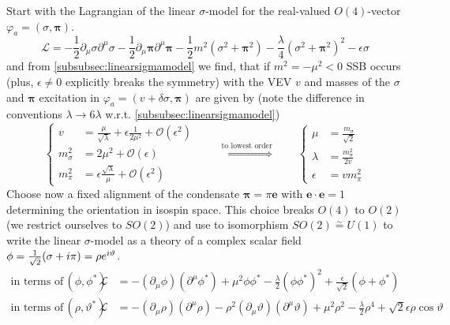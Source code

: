 Start with the Lagrangian of the linear $\sigma$-model for the real-valued $O(4)$-vector $\varphi_a=(\sigma,\mathbf{\pi})$.
\begin{equation}
    \mathscr{L}=-\frac{1}{2}\partial_\mu\sigma\partial^\mu\sigma-\frac{1}{2}\partial_\mu\mathbf{\pi}\partial^\mu\mathbf{\pi}-\frac{1}{2}m^2(\sigma^2+\mathbf{\pi}^2)-\frac{\lambda}{4}(\sigma^2+\mathbf{\pi}^2)^2-\epsilon\sigma
\end{equation}
and from \ref{subsubsec:linearsigmamodel} we find, that if $m^2=-\mu^2<0$ SSB occurs (plus, $\epsilon\neq 0$ explicitly breaks the symmetry) with the VEV $v$ and masses of the $\sigma$ and $\mathbf{\pi}$ excitation in $\varphi_a=(v+\delta\sigma,\mathbf{\pi})$ are given by (note the difference in conventions $\lambda\to 6\lambda$ w.r.t. \ref{subsubsec:linearsigmamodel})
\begin{equation}
    \left\{
    \begin{split}
        v          & =\frac{\mu}{\sqrt{\lambda}}+\epsilon\frac{1}{2\mu^2}+\mathcal{O}(\epsilon^2) \\
        m_\sigma^2 & =2\mu^2+\mathcal{O}(\epsilon)                                                \\
        m_\pi^2    & =\epsilon\frac{\sqrt{\lambda}}{\mu}+\mathcal{O}(\epsilon^2)
    \end{split}
    \right.\qquad\overset{\text{to lowest order}}{\iff}\qquad
    \left\{
    \begin{split}
        \mu&=\frac{m_\sigma}{\sqrt{2}}\\
        \lambda&=\frac{m_\sigma^2}{2v}\\
        \epsilon&=vm_\pi^2
    \end{split}
    \right.
    \label{eq:LinearSigmaModel_CouplingsMassesRelation}
\end{equation}
Choose now a fixed alignment of the condensate $\mathbf{\pi}=\pi\mathbf{e}$ with $\mathbf{e}\cdot\mathbf{e}=1$ determining the orientation in isospin space. This choice breaks $O(4)$ to $O(2)$ (we restrict ourselves to $SO(2)$) and use to isomorphism $SO(2)\overset{\sim}{=}U(1)$ to write the linear $\sigma$-model as a theory of a complex scalar field $\phi=\frac{1}{\sqrt{2}}(\sigma+{i}\pi)=\rho e^{{i}\vartheta}$.
\begin{subequations}
    \begin{align}
        \text{in terms of}\,(\phi,\phi^*)      &  & \mathscr{L} & =-(\partial_\mu\phi)(\partial^\mu\phi^*)+\mu^2\phi\phi^*-\frac{\lambda}{2}(\phi\phi^*)^2+\frac{\epsilon}{\sqrt{2}}(\phi+\phi^*)                                   \\
        \text{in terms of}\,(\rho,\vartheta^*) &  & \mathscr{L} & =-(\partial_\mu\rho)(\partial^\mu\rho)-\rho^2(\partial_\mu\vartheta)(\partial^\mu\vartheta)+\mu^2\rho^2-\frac{\lambda}{2}\rho^4+\sqrt{2}\epsilon\rho\cos\vartheta
    \end{align}
\end{subequations}
